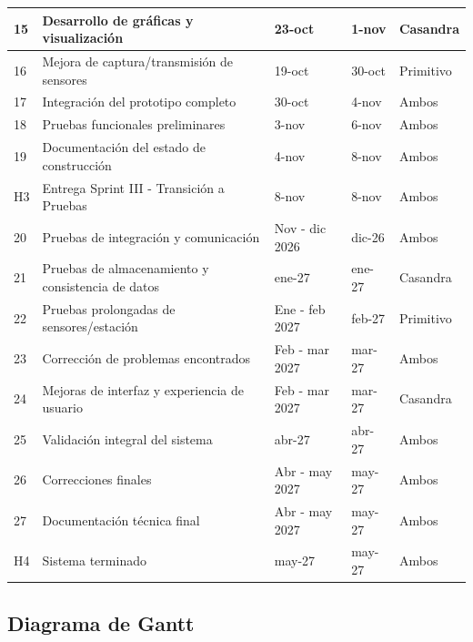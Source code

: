 \begin{table}[H]
\begin{tabular}{|l|l|l|l|l|}
        15 & Desarrollo de gráficas y visualización & 23-oct & 1-nov & Casandra  \\ \hline
        16 & Mejora de captura/transmisión de sensores & 19-oct & 30-oct & Primitivo  \\ \hline
        17 & Integración del prototipo completo & 30-oct & 4-nov & Ambos  \\ \hline
        18 & Pruebas funcionales preliminares & 3-nov & 6-nov & Ambos  \\ \hline
        19 & Documentación del estado de construcción & 4-nov & 8-nov & Ambos  \\ \hline
        H3 & Entrega Sprint III - Transición a Pruebas & 8-nov & 8-nov & Ambos  \\ \hline
        20 & Pruebas de integración y comunicación & Nov - dic 2026 & dic-26 & Ambos  \\ \hline
        21 & Pruebas de almacenamiento y consistencia de datos & ene-27 & ene-27 & Casandra  \\ \hline
        22 & Pruebas prolongadas de sensores/estación & Ene - feb 2027 & feb-27 & Primitivo  \\ \hline
        23 & Corrección de problemas encontrados & Feb - mar 2027 & mar-27 & Ambos  \\ \hline
        24 & Mejoras de interfaz y experiencia de usuario & Feb - mar 2027 & mar-27 & Casandra  \\ \hline
        25 & Validación integral del sistema & abr-27 & abr-27 & Ambos  \\ \hline
        26 & Correcciones finales & Abr - may 2027 & may-27 & Ambos  \\ \hline
        27 & Documentación técnica final & Abr - may 2027 & may-27 & Ambos  \\ \hline
        H4 & Sistema terminado & may-27 & may-27 & Ambos  \\ \hline
    \end{tabular}
\end{table}
 
\subsection{Diagrama de Gantt}

